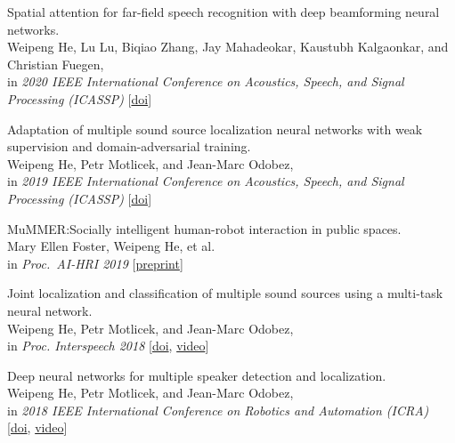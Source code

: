 \documentclass[a4paper,9pt]{extarticle} %
\begin{document}
\begin{enumerate}[label={[\arabic*]}]
  \item Spatial attention for far-field speech recognition with deep beamforming neural networks. \\
        Weipeng He, Lu Lu, Biqiao Zhang, Jay Mahadeokar, Kaustubh Kalgaonkar, and Christian Fuegen, \\
        in \textit{2020 IEEE International Conference on Acoustics, Speech, and Signal Processing (ICASSP)}
        [\href{https://doi.org/10.1109/ICASSP40776.2020.9053439}{doi}]


  \item Adaptation of multiple sound source localization neural networks with weak supervision and domain-adversarial training. \\
        Weipeng He, Petr Motlicek, and Jean-Marc Odobez, \\
        in \textit{2019 IEEE International Conference on Acoustics, Speech, and Signal Processing (ICASSP)}
        [\href{https://doi.org/10.1109/ICASSP.2019.8682655}{doi}]

  \item MuMMER:\@ Socially intelligent human-robot interaction in public spaces. \\
        Mary Ellen Foster, Weipeng He, et al. \\
        in \textit{Proc.\ AI-HRI 2019}
        [\href{https://arxiv.org/abs/1909.06749}{preprint}]

  \item Joint localization and classification of multiple sound sources using a multi-task neural network. \\
        Weipeng He, Petr Motlicek, and Jean-Marc Odobez, \\
        in \textit{Proc. Interspeech 2018}
        [\href{http://doi.org/10.21437/Interspeech.2018-1269}{doi}, \href{https://www.youtube.com/watch?v=O7bQvg03RTc}{video}]

  \item Deep neural networks for multiple speaker detection and localization. \\
        Weipeng He, Petr Motlicek, and Jean-Marc Odobez, \\
        in \textit{2018 IEEE International Conference on Robotics and Automation (ICRA)}
        [\href{http://doi.org/10.1109/ICRA.2018.8461267}{doi}, \href{https://www.youtube.com/watch?v=_4EwuVlE_pU}{video}]


\end{enumerate}
\end{document}
